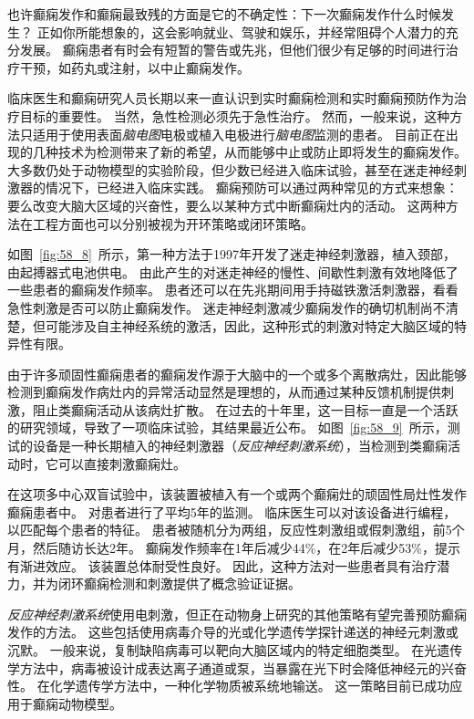 \begin{proposition}[实时检测和预防癫痫的新方法] \label{box:58_2}
	
	\quad \quad 也许癫痫发作和癫痫最致残的方面是它的不确定性：下一次癫痫发作什么时候发生？
	正如你所能想象的，这会影响就业、驾驶和娱乐，并经常阻碍个人潜力的充分发展。
	癫痫患者有时会有短暂的警告或先兆，但他们很少有足够的时间进行治疗干预，如药丸或注射，以中止癫痫发作。
	
	\quad \quad 临床医生和癫痫研究人员长期以来一直认识到实时癫痫检测和实时癫痫预防作为治疗目标的重要性。
	当然，急性检测必须先于急性治疗。
	然而，一般来说，这种方法只适用于使用表面\textit{脑电图}电极或植入电极进行\textit{脑电图}监测的患者。
	目前正在出现的几种技术为检测带来了新的希望，从而能够中止或防止即将发生的癫痫发作。
	大多数仍处于动物模型的实验阶段，但少数已经进入临床试验，甚至在迷走神经刺激器的情况下，已经进入临床实践。
	癫痫预防可以通过两种常见的方式来想象：要么改变大脑大区域的兴奋性，要么以某种方式中断癫痫灶内的活动。
	这两种方法在工程方面也可以分别被视为开环策略或闭环策略。
	
	\quad \quad 如图~\ref{fig:58_8}~所示，第一种方法于1997年开发了迷走神经刺激器，植入颈部，由起搏器式电池供电。
	由此产生的对迷走神经的慢性、间歇性刺激有效地降低了一些患者的癫痫发作频率。
	患者还可以在先兆期间用手持磁铁激活刺激器，看看急性刺激是否可以防止癫痫发作。
	迷走神经刺激减少癫痫发作的确切机制尚不清楚，但可能涉及自主神经系统的激活，因此，这种形式的刺激对特定大脑区域的特异性有限。
	
	\quad \quad 由于许多顽固性癫痫患者的癫痫发作源于大脑中的一个或多个离散病灶，因此能够检测到癫痫发作病灶内的异常活动显然是理想的，从而通过某种反馈机制提供刺激，阻止类癫痫活动从该病灶扩散。
	在过去的十年里，这一目标一直是一个活跃的研究领域，导致了一项临床试验，其结果最近公布。
	如图~\ref{fig:58_9}~所示，测试的设备是一种长期植入的神经刺激器（\textit{反应神经刺激系统}），当检测到类癫痫活动时，它可以直接刺激癫痫灶。
	
	\quad \quad 在这项多中心双盲试验中，该装置被植入有一个或两个癫痫灶的顽固性局灶性发作癫痫患者中。
	对患者进行了平均5年的监测。
	临床医生可以对该设备进行编程，以匹配每个患者的特征。
	患者被随机分为两组，反应性刺激组或假刺激组，前5个月，然后随访长达2年。
	癫痫发作频率在1年后减少44\%，在2年后减少53\%，提示有渐进效应。
	该装置总体耐受性良好。
	因此，这种方法对一些患者具有治疗潜力，并为闭环癫痫检测和刺激提供了概念验证证据。
	
	\quad \quad \textit{反应神经刺激系统}使用电刺激，但正在动物身上研究的其他策略有望完善预防癫痫发作的方法。
	这些包括使用病毒介导的光或化学遗传学探针递送的神经元刺激或沉默。
	一般来说，复制缺陷病毒可以靶向大脑区域内的特定细胞类型。
	在光遗传学方法中，病毒被设计成表达离子通道或泵，当暴露在光下时会降低神经元的兴奋性。
	在化学遗传学方法中，一种化学物质被系统地输送。
	这一策略目前已成功应用于癫痫动物模型。
	

\end{proposition}
